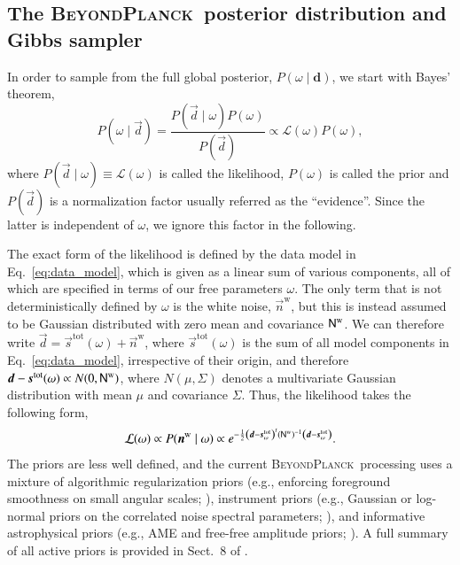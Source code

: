 \documentclass[twocolumn]{aa}
\renewcommand{\d}[0]{\vec{d}}
\newcommand{\n}[0]{\vec{n}}
\newcommand{\s}[0]{\vec{s}}
\newcommand{\N}[0]{\tens{N}}
\newcommand{\BP}{\textsc{BeyondPlanck}}
\begin{document}
\subsection{The \BP\ posterior distribution and Gibbs sampler}

In order to sample from the full global posterior, $P(\omega
\mid\mathbf{d})$, we start with Bayes' theorem,
\begin{equation}
  \label{eq:bayes}
  P(\omega\mid\d)=\frac{P(\d\mid\omega)P(\omega)}{P(\d)}
  \propto \mathcal{L}(\omega)P(\omega),
\end{equation}
where $P(\d\mid\omega)\equiv\mathcal{L}(\omega)$ is called the
likelihood, $P(\omega)$ is called the prior and $P(\d)$ is a
normalization factor usually referred as the ``evidence''. Since the
latter is independent of $\omega$, we ignore this factor in the
following.

The exact form of the likelihood is defined by the data model in
Eq.~\eqref{eq:data_model}, which is given as a linear sum of various
components, all of which are specified in terms of our free parameters
$\omega$. The only term that is not deterministically defined by
$\omega$ is the white noise, $\n^{\mathrm{w}}$, but this is instead
assumed to be Gaussian distributed with zero mean and covariance
$\N^{\mathrm{w}}$. We can therefore write
$\d=\s^{\mathrm{tot}}(\omega)+\n^\mathrm{w}$, where
$\s^{\mathrm{tot}}(\omega)$ is the sum of all model components in
Eq.~\eqref{eq:data_model}, irrespective of their origin, and therefore
$\d-\s^{\mathrm{tot}}(\omega) \propto N(0,\N^{\mathrm{w}})$, where
$N(\mu,\Sigma)$ denotes a multivariate Gaussian distribution with mean
$\mu$ and covariance $\Sigma$. Thus, the likelihood takes the
following form,
\begin{equation}
  \label{eq:bp_like}
  \mathcal{L}(\omega)\propto P(\n^\mathrm{w}\mid\omega)\propto
  e^{-\frac{1}{2}\left(\d-\s^{\mathrm{tot}}_\omega\right)^t(\N^{\mathrm{w}})^{-1}
  \left(\d-\s^{\mathrm{tot}}_\omega\right)}.
\end{equation}
The priors are less well defined, and the current \BP\ processing uses
a mixture of algorithmic regularization priors (e.g., enforcing
foreground smoothness on small angular scales; \citealp{bp13}),
instrument priors (e.g., Gaussian or log-normal priors on the
correlated noise spectral parameters; \citealp{bp06}), and informative
astrophysical priors (e.g., AME and free-free amplitude priors;
\citealp{bp13,bp11}). A full summary of all active priors is provided in
Sect.~8 of \citet{bp01}.
\end{document}
